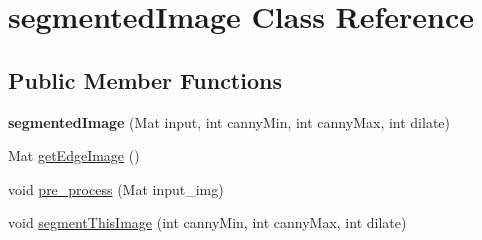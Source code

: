 \hypertarget{classsegmentedImage}{
\section{segmentedImage Class Reference}
\label{classsegmentedImage}
}
\subsection*{Public Member Functions}
\begin{DoxyCompactItemize}
\item 
\hypertarget{classsegmentedImage_ab7b842261ca5b4e83549e9b8d866f439}{
{\bfseries segmentedImage} (Mat input, int cannyMin, int cannyMax, int dilate)}
\label{classsegmentedImage_ab7b842261ca5b4e83549e9b8d866f439}

\item 
Mat \hyperlink{classsegmentedImage_a044e9378bc9e068f99b977ce80254f35}{getEdgeImage} ()
\item 
void \hyperlink{classsegmentedImage_a428bdd95c64f3c7b7ef076353a539bd2}{pre\_\-process} (Mat input\_\-img)
\item 
void \hyperlink{classsegmentedImage_ab1d04fda23e6ffcdc9bfb971710f4f41}{segmentThisImage} (int cannyMin, int cannyMax, int dilate)
\end{DoxyCompactItemize}


